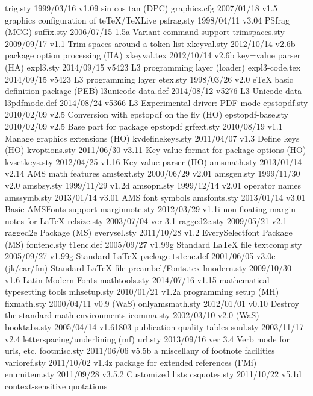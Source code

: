     trig.sty    1999/03/16 v1.09 sin cos tan (DPC)
graphics.cfg    2007/01/18 v1.5 graphics configuration of teTeX/TeXLive
  psfrag.sty    1998/04/11 v3.04 PSfrag (MCG)
  suffix.sty    2006/07/15 1.5a Variant command support
trimspaces.sty    2009/09/17 v1.1 Trim spaces around a token list
 xkeyval.sty    2012/10/14 v2.6b package option processing (HA)
 xkeyval.tex    2012/10/14 v2.6b key=value parser (HA)
   expl3.sty    2014/09/15 v5423 L3 programming layer (loader) 
expl3-code.tex    2014/09/15 v5423 L3 programming layer 
    etex.sty    1998/03/26 v2.0 eTeX basic definition package (PEB)
l3unicode-data.def    2014/08/12 v5276 L3 Unicode data
l3pdfmode.def    2014/08/24 v5366 L3 Experimental driver: PDF mode
epstopdf.sty    2010/02/09 v2.5 Conversion with epstopdf on the fly (HO)
epstopdf-base.sty    2010/02/09 v2.5 Base part for package epstopdf
  grfext.sty    2010/08/19 v1.1 Manage graphics extensions (HO)
kvdefinekeys.sty    2011/04/07 v1.3 Define keys (HO)
kvoptions.sty    2011/06/30 v3.11 Key value format for package options (HO)
kvsetkeys.sty    2012/04/25 v1.16 Key value parser (HO)
 amsmath.sty    2013/01/14 v2.14 AMS math features
 amstext.sty    2000/06/29 v2.01
  amsgen.sty    1999/11/30 v2.0
  amsbsy.sty    1999/11/29 v1.2d
  amsopn.sty    1999/12/14 v2.01 operator names
 amssymb.sty    2013/01/14 v3.01 AMS font symbols
amsfonts.sty    2013/01/14 v3.01 Basic AMSFonts support
marginnote.sty    2012/03/29 v1.1i non floating margin notes for LaTeX
 relsize.sty    2003/07/04 ver 3.1
ragged2e.sty    2009/05/21 v2.1 ragged2e Package (MS)
everysel.sty    2011/10/28 v1.2 EverySelectfont Package (MS)
 fontenc.sty
   t1enc.def    2005/09/27 v1.99g Standard LaTeX file
textcomp.sty    2005/09/27 v1.99g Standard LaTeX package
  ts1enc.def    2001/06/05 v3.0e (jk/car/fm) Standard LaTeX file
preambel/Fonts.tex
 lmodern.sty    2009/10/30 v1.6 Latin Modern Fonts
mathtools.sty    2014/07/16 v1.15 mathematical typesetting tools
 mhsetup.sty    2010/01/21 v1.2a programming setup (MH)
 fixmath.sty    2000/04/11 v0.9 (WaS)
onlyamsmath.sty    2012/01/01 v0.10 Destroy the standard math environments
  icomma.sty    2002/03/10 v2.0 (WaS)
booktabs.sty    2005/04/14 v1.61803 publication quality tables
    soul.sty    2003/11/17 v2.4 letterspacing/underlining (mf)
     url.sty    2013/09/16  ver 3.4  Verb mode for urls, etc.
footmisc.sty    2011/06/06 v5.5b a miscellany of footnote facilities
varioref.sty    2011/10/02 v1.4z package for extended references (FMi)
enumitem.sty    2011/09/28 v3.5.2 Customized lists
csquotes.sty    2011/10/22 v5.1d context-sensitive quotations

